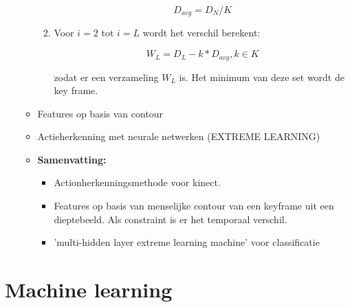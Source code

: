 \begin{itemize}
\begin{itemize}
\begin{enumerate}
			$$D_{avg} = D_N / K$$
			
			\item Voor $i = 2$ tot $i = L$ wordt het verschil berekent:
			
			$$W_L = D_L - k * D_{avg}, k \in K$$
			
			zodat er een verzameling ${W_L}$ is. Het minimum van deze set wordt de key frame.
		\end{enumerate}
		\item Features op basis van contour
		\item Actieherkenning met neurale netwerken (EXTREME LEARNING)
		\item \textbf{Samenvatting:}
		\begin{itemize}
			\item Actionherkenningsmethode voor kinect.
			\item Features op basis van menselijke contour van een keyframe uit een dieptebeeld. Als constraint is er het temporaal verschil.
			\item 'multi-hidden layer extreme learning machine' voor classificatie
		
		\end{itemize}
		
	\end{itemize}
\end{itemize}




\section{Machine learning}
